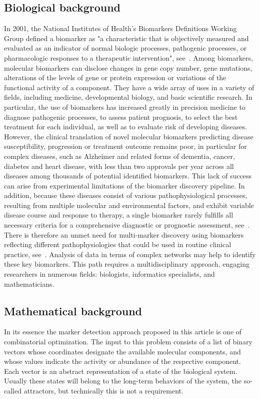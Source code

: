 \documentclass[11pt]{article}
\begin{document}
    \subsection{Biological background}
    In 2001, the National Institutes of Health's Biomarkers Definitions Working Group defined a biomarker as "a characteristic that is objectively measured and evaluated as an indicator of normal biologic processes, pathogenic processes, or pharmacologic responses to a therapeutic intervention", see~\cite{biomarkers2001biomarkers}.
    Among biomarkers, molecular biomarkers can disclose changes in gene copy number, gene mutations, alterations of the levels of gene or protein expression or variations of the functional activity of a component.
    They have a wide array of uses in a variety of fields, including medicine, developmental biology, and basic scientific research.
    In particular, the use of biomarkers has increased greatly in precision medicine to diagnose pathogenic processes, to assess patient prognosis, to select the best treatment for each individual, as well as to evaluate risk of developing diseases.
    However, the clinical translation of novel molecular biomarkers predicting disease susceptibility, progression or treatment outcome remains poor, in particular for complex diseases, such as Alzheimer and related forms of dementia, cancer, diabetes and heart disease, with less than two approvals per year across all diseases among thousands of potential identified biomarkers.
    This lack of success can arise from experimental limitations of the biomarker discovery pipeline.
    In addition, because these diseases consist of various pathophysiological processes, resulting from multiple molecular and environmental factors, and exhibit variable disease course and response to therapy, a single biomarker rarely fulfills all necessary criteria for a comprehensive diagnostic or prognostic assessment, see~\cite{antoranz2017mechanism}.
    There is therefore an unmet need for multi-marker discovery using biomarkers reflecting different pathophysiologies that could be used in routine clinical practice, see~\cite{ball2010evaluation}.
    Analysis of data in terms of complex networks may help to identify these key biomarkers.
    This path requires a multidisciplinary approach, engaging researchers in numerous fields: biologists, informatics specialists, and mathematicians.

    \subsection{Mathematical background}
    In its essence the marker detection approach proposed in this article is one of combinatorial optimization.
    The input to this problem consists of a list of binary vectors whose coordinates designate the available molecular components, and whose values indicate the activity or abundance of the respective component.
    Each vector is an abstract representation of a state of the biological system.
    Usually these states will belong to the long-term behaviors of the system, the so-called attractors, but technically this is not a requirement.
\end{document}
